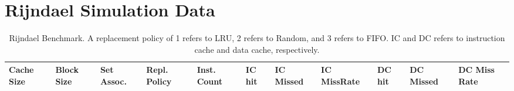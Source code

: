 \documentclass[conference]{IEEEtran}
\begin{document}
\section{Rijndael Simulation Data}
\begin{table}
  \caption{Rijndael Benchmark. A replacement policy of 1 refers to LRU, 2 refers to Random, and 3 refers to FIFO. IC and DC refers to instruction cache and data cache, respectively.}
  \centering
  \begin{tabular}{|m{.75cm} |m{.75cm} |m{.8cm} | m{.75cm} | l | l | l | l | l | l | l |}
    \hline
    \textbf{Cache Size} & \textbf{ Block Size} & \textbf{Set Assoc.} & \textbf{Repl. Policy} & \textbf{Inst. Count} & \textbf{IC hit} & \textbf{IC Missed} & \textbf{IC MissRate} & \textbf{DC hit} & \textbf{DC Missed} & \textbf{DC Miss Rate} \\ \hline


\end{tabular}
\end{table}
\end{document}
